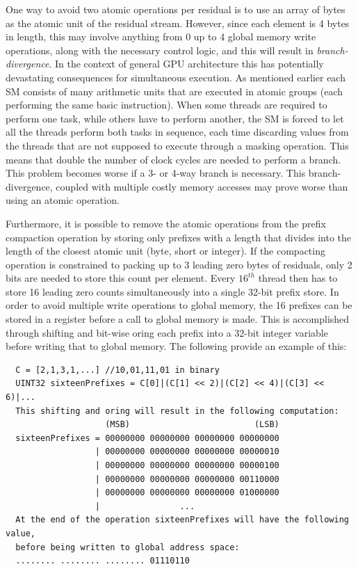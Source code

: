  One way to avoid two atomic operations per residual is to use an array of bytes as the atomic unit of the residual stream. However, since each element is 4 bytes in length, this may involve anything from 0 up to 4 global memory
 write operations, along with the necessary control logic, and this will result in \textit{branch-divergence}. In the context of general GPU architecture this has potentially devastating consequences for simultaneous execution. As mentioned
 earlier each SM consists of many arithmetic units that are executed in atomic groups (each performing the same basic instruction). When some threads are required to perform one task, while others have to perform another, the
 SM is forced to let all the threads perform both tasks in sequence, each time discarding values from the threads that are not supposed to execute through a masking operation. This means that double the number of clock cycles are needed
 to perform a branch. This problem becomes worse if a 3- or 4-way branch is necessary. This branch-divergence, coupled with multiple costly memory accesses may prove worse than using an atomic operation. 
 
 Furthermore, it is possible to remove the atomic operations from the prefix compaction operation by storing only prefixes with a length that divides into the length of the closest atomic unit (byte, short or integer). If the compacting 
 operation is constrained to packing up to 3 leading zero bytes of residuals, only 2 bits are needed to store this count per element. Every $16^{th}$ thread then has to store 16 leading zero counts simultaneously 
 into a single 32-bit prefix store. In order to avoid multiple write operations to global memory, the 16 prefixes can be stored in a register before a call to global memory is made. This is accomplished through
 shifting and bit-wise oring each prefix into a 32-bit integer variable before writing that to global memory. The following provide an example of this:
 \begin{verbatim}
  C = [2,1,3,1,...] //10,01,11,01 in binary
  UINT32 sixteenPrefixes = C[0]|(C[1] << 2)|(C[2] << 4)|(C[3] << 6)|...
  This shifting and oring will result in the following computation:
                    (MSB)                         (LSB)    
  sixteenPrefixes = 00000000 00000000 00000000 00000000
                  | 00000000 00000000 00000000 00000010
                  | 00000000 00000000 00000000 00000100
                  | 00000000 00000000 00000000 00110000
                  | 00000000 00000000 00000000 01000000
                  |                ...
  At the end of the operation sixteenPrefixes will have the following value,
  before being written to global address space:
  ........ ........ ........ 01110110
 \end{verbatim}

